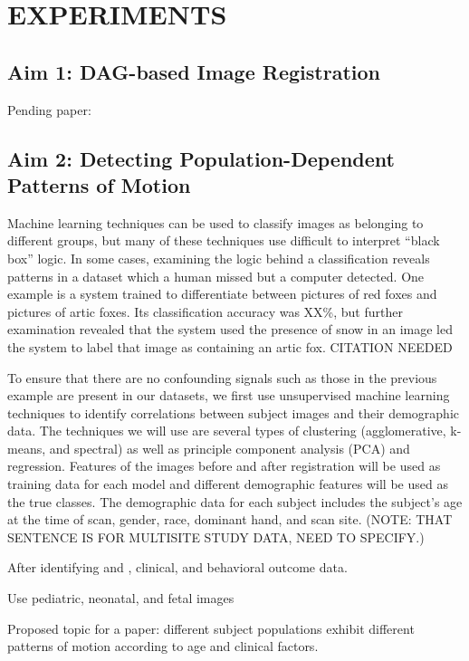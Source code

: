\chapter{EXPERIMENTS}

\section{Aim 1: DAG-based Image Registration}

Pending paper: 

\section{Aim 2: Detecting Population-Dependent Patterns of Motion}

Machine learning techniques can be used to classify images as belonging to different groups, but many of these techniques use difficult to interpret ``black box'' logic. In some cases, examining the logic behind a classification reveals patterns in a dataset which a human missed but a computer detected. One example is a system trained to differentiate between pictures of red foxes and pictures of artic foxes. Its classification accuracy was XX\%, but further examination revealed that the system used the presence of snow in an image led the system to label that image as containing an artic fox. CITATION NEEDED

To ensure that there are no confounding signals such as those in the previous example are present in our datasets, we first use unsupervised machine learning techniques to identify correlations between subject images and their demographic data. The techniques we will use are several types of clustering (agglomerative, k-means, and spectral) as well as principle component analysis (PCA) and regression. Features of the images before and after registration will be used as training data for each model and different demographic features will be used as the true classes. The demographic data for each subject includes the subject's age at the time of scan, gender, race, dominant hand, and scan site. (NOTE: THAT SENTENCE IS FOR MULTISITE STUDY DATA, NEED TO SPECIFY.)

After identifying and , clinical, and behavioral outcome data. 

Use pediatric, neonatal, and fetal images

Proposed topic for a paper: different subject populations exhibit different patterns of motion according to age and clinical factors. 

